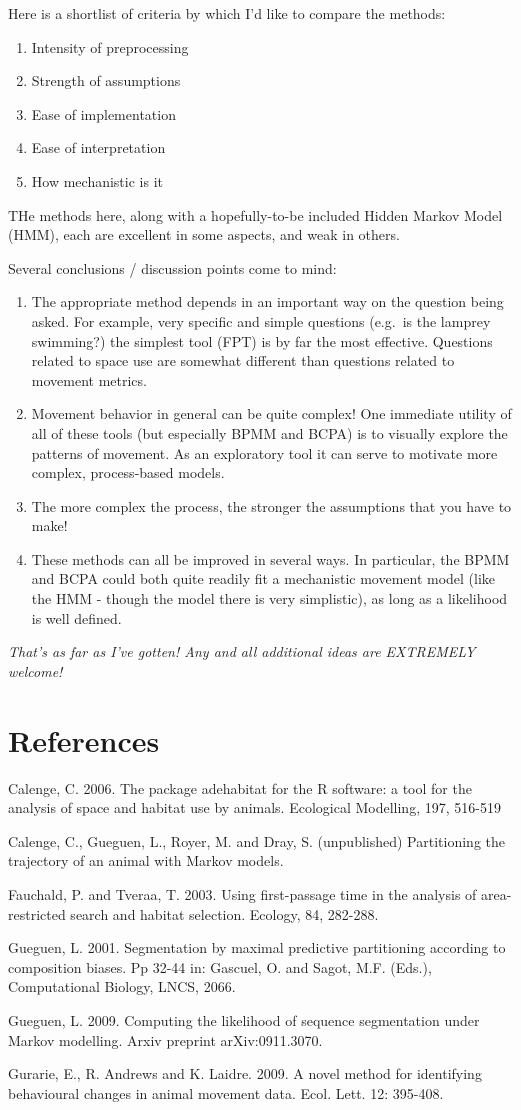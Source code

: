 \documentclass[10pt]{article}\usepackage{graphicx, color}
\newcommand{\ben}{\begin{enumerate}}
\newcommand{\een}{\end{enumerate}}
\newcommand{\I}{\item}
\begin{document}
Here is a shortlist of criteria by which I'd like to compare the methods:

\ben
  \I Intensity of preprocessing
  \I Strength of assumptions
  \I Ease of implementation
  \I Ease of interpretation
  \I How mechanistic is it
\een

THe methods here, along with a hopefully-to-be included Hidden Markov Model (HMM), each are excellent in some aspects, and weak in others.  


Several conclusions / discussion points come to mind: 
\ben 
  \I The appropriate method depends in an important way on the question being asked.  For example, very specific and simple questions (e.g.~is the lamprey swimming?) the simplest tool (FPT) is by far the most effective.  Questions related to space use are somewhat different than questions related to movement metrics. 
  \I Movement behavior in general can be quite complex!  One immediate utility of all of these tools (but especially BPMM and BCPA) is to visually explore the patterns of movement.  As an exploratory tool it can serve to motivate more complex, process-based models. 
  \I The more complex the process, the stronger the assumptions that you have to make!
  \I These methods can all be improved in several ways.  In particular, the BPMM and BCPA could both quite readily fit a mechanistic movement model (like the HMM - though the model there is very simplistic), as long as a likelihood is well defined.
\een

\large \emph{That's as far as I've gotten!  Any and all additional ideas are EXTREMELY welcome!}

\normalsize

\section{References}
\begin{description}

\item Calenge, C. 2006. The package adehabitat for the R software: a tool for the analysis of space and habitat use by animals. Ecological Modelling, 197, 516-519
\item Calenge, C., Gueguen, L., Royer, M. and Dray, S. (unpublished) Partitioning the trajectory of an animal with Markov models.
\item Fauchald, P. and Tveraa, T. 2003. Using first-passage time in the analysis of area-restricted search and habitat selection.  Ecology, 84, 282-288.
\item Gueguen, L. 2001. Segmentation by maximal predictive partitioning according to composition biases. Pp 32-44 in: Gascuel, O. and Sagot, M.F. (Eds.), Computational Biology, LNCS, 2066.
\item Gueguen, L. 2009. Computing the likelihood of sequence segmentation under Markov modelling. Arxiv preprint arXiv:0911.3070.
\item Gurarie, E., R. Andrews and K. Laidre. 2009. A novel method for identifying behavioural changes in animal movement data. Ecol. Lett. 12: 395-408.

\end{description}
\end{document}
